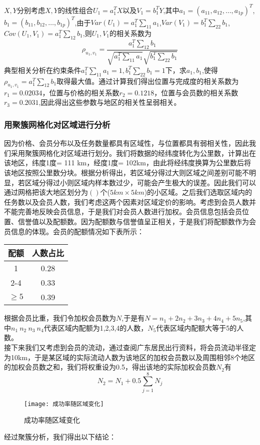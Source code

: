 \documentclass{ctexart}
\begin{document}
$X,Y$分别考虑$X,Y$的线性组合$U_1=a^{T}_{1}X$以及$V_1=b^{T}_{1}Y$,其中$a_1=(a_{11},a_{12},\dots,a_{1p})^T$,$b_1=(b_{11},b_{12},\dots,b_{1p})^T$,由于$Var(U_1)=a_{1}^{T}\sum_{11} a_1$,$Var(V_1)=b_{1}^{T}\sum_{22} b_1$,$Cov(U_1,V_1)=a_{1}^{T}\sum_{12} b_1$,则$U_1,V_1$的相关系数为$$\rho_{u_1,v_1}=\frac{a_{1}^{T}\sum_{12} b_1}{\sqrt{a_{1}^{T}\sum_{11} a_1} \sqrt{b_{1}^{T}\sum_{22} b_1}}$$
典型相关分析在约束条件$a_{1}^{T}\sum_{11} a_1=1,b_{1}^{T}\sum_{22} b_1=1$下，求$a_1,b_1$,使得
$\rho_{u_1,v_1}={a_{1}^{T}\sum_{12} b_1}$取得最大值。通过计算我们得出位置与完成度的相关系数为$r_1=0.02034$，位置与价格的相关系数$r_2=0.1218$，位置与会员数的相关系数$r_3=0.2031$,因此得出这些参数与地区的相关性呈弱相关。
\subsubsection{用聚簇网格化对区域进行分析}
因为价格、会员分布以及任务数量都具有区域性，与位置都具有弱相关性，因此我们采用聚簇网格化对区域进行划分。我们将数据的经纬度转化为公里数，计算出在该地区，纬度1度= 111 km，经度1度= 102km，由此将经纬度换算为公里数后将该地区按照公里数分块。根据分析得出，若区域分得过大则区域之间差别可能不明显，若区域分得过小则区域内样本数过少，可能会产生极大的误差。因此我们可以通过网格把该大地区划分为$()$个($5km\times5km$)的小区域。之后我们选取区域内的任务数以及会员人数，我们考虑这两个因素对区域定价的影响。考虑到会员人数并不能完善地反映会员信息，于是我们对会员人数进行加权。会员信息包括会员位置、信誉值以及配额数。因为配额数与信誉值呈正相关，于是我们将配额数作为会员信息的体现。会员的配额情况如下表所示：
\begin{table}[htbp]
\centering
\begin{tabular}{|c|c|}
\hline
配额&人数占比\\
\hline
1 &0.28\\
\hline
2-4&0.33\\
\hline
$\ge5$&0.39\\
\hline
\end{tabular}
\end{table}
\newpage
根据会员比重，我们令加权会员数为$N$,于是有$N=n_1+2n_2+3n_3+4n_4+5n_5$,其中$n_1\ n_2\ n_3\ n_4$代表区域内配额为1,2,3,4的人数，$N_5$代表区域内配额大等于5的人数。
\\
接下来我们又考虑到会员的流动，通过查阅广东居民出行资料，将会员流动半径定为10km，于是某区域的实际流动人数为该地区的加权会员数以及周围相邻8个地区的加权会员数之和，我们将权重设为0.5，得出该地的实际加权会员数$N_2$有$$N_2=N_1+0.5\sum_{j=1}^{8}N_j$$
\begin{figure}[htbp] 
\centering
\texttt{[image: 成功率随区域变化]} 
\caption{成功率随区域变化}
\end{figure}
\newpage
经过聚簇分析，我们得出以下结论：
\end{document}
